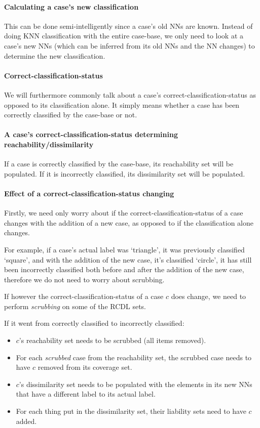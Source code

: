 \documentclass[a4paper,11pt]{report}
\begin{document}
\paragraph{Calculating a case's new classification}
This can be done semi-intelligently since a case's old NNs are known. Instead of doing KNN classification with the entire case-base, we only need to look at a case's new NNs (which can be inferred from its old NNs and the NN changes) to determine the new classification.

\paragraph{Correct-classification-status}
We will furthermore commonly talk about a case's correct-classification-status as opposed to its classification alone. It simply means whether a case has been correctly classified by the case-base or not. 

\paragraph{A case's correct-classification-status determining reachability/dissimilarity}
If a case is correctly classified by the case-base, its reachability set will be populated. If it is incorrectly classified, its dissimilarity set will be populated.
 
\paragraph{Effect of a correct-classification-status changing}
Firstly, we need only worry about if the correct-classification-status of a case changes with the addition of a new case, as opposed to if the classification alone changes.

For example, if a case's actual label was `triangle', it was previously classified `square', and with the addition of the new case, it's classified `circle', it has still been incorrectly classified both before and after the addition of the new case, therefore we do not need to worry about scrubbing.

If however the correct-classification-status of a case $c$ does change, we need to perform \emph{scrubbing} on some of the RCDL sets.

If it went from correctly classified to incorrectly classified:
\begin{itemize}
	\item $c$'s reachability set needs to be scrubbed (all items removed).
	\item For each \emph{scrubbed} case from the reachability set, the scrubbed case needs to have $c$ removed from its coverage set.
	\item $c$'s dissimilarity set needs to be populated with the elements in its new NNs that have a different label to its actual label.
	\item For each thing put in the dissimilarity set, their liability sets need to have $c$ added.
\end{itemize}
\end{document}
